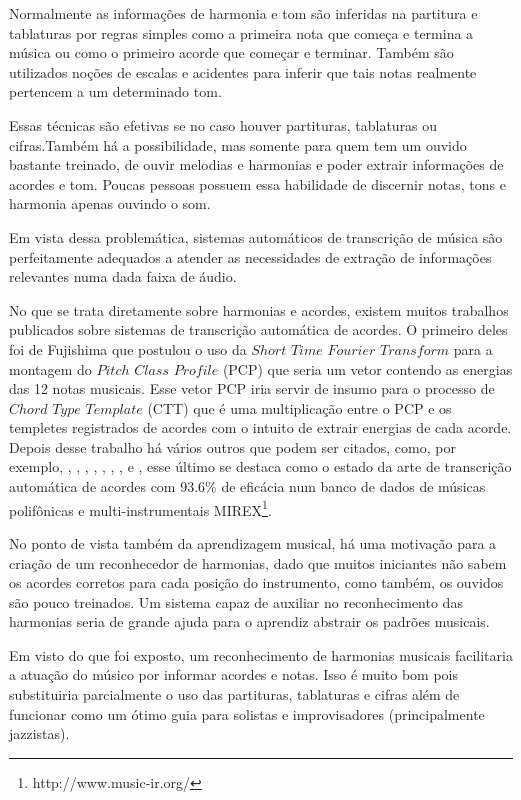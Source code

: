 Normalmente as informações de harmonia e tom são inferidas na partitura e tablaturas por regras simples como a primeira nota que começa e termina a música ou como o primeiro acorde que começar e terminar. Também são utilizados noções de escalas e acidentes para inferir que tais notas realmente pertencem a um determinado tom.

Essas técnicas são efetivas se no caso houver partituras, tablaturas ou cifras.Também há a possibilidade, mas somente para quem tem um ouvido bastante treinado, de ouvir melodias e harmonias e poder extrair informações de acordes e tom. Poucas pessoas possuem essa habilidade de discernir notas, tons e harmonia apenas ouvindo o som.

Em vista dessa problemática, sistemas automáticos de transcrição de música \cite{automaticmusic} são perfeitamente adequados a atender as necessidades de extração de informações relevantes numa dada faixa de áudio.

No que se trata diretamente sobre harmonias e acordes, existem muitos trabalhos publicados sobre sistemas de transcrição automática de acordes. O primeiro deles foi de Fujishima \cite{fujishima1999realtime} que postulou o uso da $Short$ $Time$ $Fourier$ $Transform$ para a montagem do $Pitch$ $Class$ $Profile$ (PCP) que seria um vetor contendo as energias das 12 notas musicais. Esse vetor PCP iria servir de insumo para o processo de $Chord$ $Type$ $Template$ (CTT) que é uma multiplicação entre o PCP e os templetes registrados de acordes com o intuito de extrair energias de cada acorde. Depois desse trabalho há vários outros que podem ser citados, como, por exemplo, \cite{khadkevich2011time}, \cite{khadkevich2011time}, \cite{harte2010towards}, \cite{peeters2006chroma}, \cite{cho2010exploring}, \cite{lee2006automatic}, \cite{chen2012chord}, \cite{de2012improving} e \cite{boulanger2013audio}, esse último se destaca como o estado da arte de transcrição automática de acordes com 93.6\% de eficácia num banco de dados de músicas polifônicas e multi-instrumentais MIREX\footnote{http://www.music-ir.org/}. 

No ponto de vista também da aprendizagem musical, há uma motivação para a criação de um reconhecedor de harmonias, dado que muitos iniciantes não sabem os acordes corretos para cada posição do instrumento, como também, os ouvidos são pouco treinados. Um sistema capaz de auxiliar no reconhecimento das harmonias seria de grande ajuda para o aprendiz abstrair os padrões musicais.

Em visto do que foi exposto, um reconhecimento de harmonias musicais facilitaria a atuação do músico por informar acordes e notas. Isso é muito bom pois substituiria parcialmente o uso das partituras, tablaturas e cifras além de funcionar como um ótimo guia para solistas e improvisadores (principalmente jazzistas).

